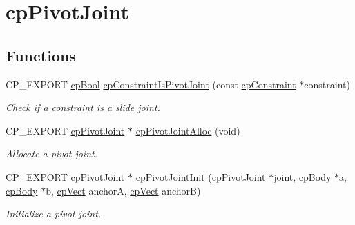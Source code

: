 \hypertarget{group__cp_pivot_joint}{}\section{cp\+Pivot\+Joint}
\label{group__cp_pivot_joint}
\subsection*{Functions}
\begin{DoxyCompactItemize}
\item 
\mbox{\label{group__cp_pivot_joint_ga9a86164f24b20fb22ac14d96958cf6e3}} 
C\+P\+\_\+\+E\+X\+P\+O\+RT \mbox{\hyperlink{group__basic_types_gabc5e752c48f3449ca26ef413ecbd647e}{cp\+Bool}} \mbox{\hyperlink{group__cp_pivot_joint_ga9a86164f24b20fb22ac14d96958cf6e3}{cp\+Constraint\+Is\+Pivot\+Joint}} (const \mbox{\hyperlink{structcp_constraint}{cp\+Constraint}} $\ast$constraint)
\begin{DoxyCompactList}\small\item\em Check if a constraint is a slide joint. \end{DoxyCompactList}\item 
\mbox{\label{group__cp_pivot_joint_ga3ef99deccfe0339056ff6bbc5a61b3f6}} 
C\+P\+\_\+\+E\+X\+P\+O\+RT \mbox{\hyperlink{structcp_pivot_joint}{cp\+Pivot\+Joint}} $\ast$ \mbox{\hyperlink{group__cp_pivot_joint_ga3ef99deccfe0339056ff6bbc5a61b3f6}{cp\+Pivot\+Joint\+Alloc}} (void)
\begin{DoxyCompactList}\small\item\em Allocate a pivot joint. \end{DoxyCompactList}\item 
\mbox{\label{group__cp_pivot_joint_ga8d41373cb3fc644f815377e8694e28d3}} 
C\+P\+\_\+\+E\+X\+P\+O\+RT \mbox{\hyperlink{structcp_pivot_joint}{cp\+Pivot\+Joint}} $\ast$ \mbox{\hyperlink{group__cp_pivot_joint_ga8d41373cb3fc644f815377e8694e28d3}{cp\+Pivot\+Joint\+Init}} (\mbox{\hyperlink{structcp_pivot_joint}{cp\+Pivot\+Joint}} $\ast$joint, \mbox{\hyperlink{structcp_body}{cp\+Body}} $\ast$a, \mbox{\hyperlink{structcp_body}{cp\+Body}} $\ast$b, \mbox{\hyperlink{structcp_vect}{cp\+Vect}} anchorA, \mbox{\hyperlink{structcp_vect}{cp\+Vect}} anchorB)
\begin{DoxyCompactList}\small\item\em Initialize a pivot joint. \end{DoxyCompactList}\item 

\end{DoxyCompactItemize}
